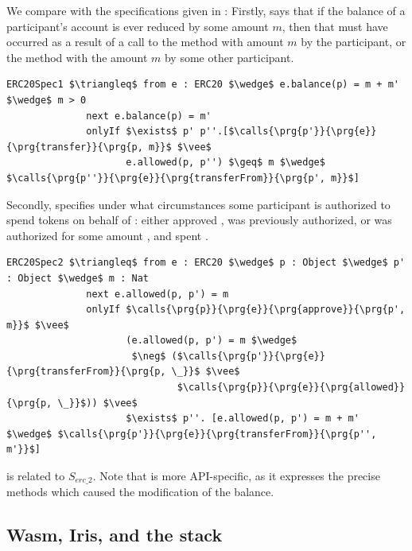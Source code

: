 \vspace{1cm}

We compare with the specifications given in \cite{OOPSLA22}:
 Firstly,  
says that if the balance of a participant's account is ever reduced by some amount $m$, then
that must have occurred as a result of a call to the  method with amount $m$ by the participant,
or the  method with the amount $m$ by some other participant.
\begin{lstlisting}[language = Chainmail, mathescape=true, frame=lines]
ERC20Spec1 $\triangleq$ from e : ERC20 $\wedge$ e.balance(p) = m + m' $\wedge$ m > 0
              next e.balance(p) = m'
              onlyIf $\exists$ p' p''.[$\calls{\prg{p'}}{\prg{e}}{\prg{transfer}}{\prg{p, m}}$ $\vee$ 
                     e.allowed(p, p'') $\geq$ m $\wedge$ $\calls{\prg{p''}}{\prg{e}}{\prg{transferFrom}}{\prg{p', m}}$]
\end{lstlisting}
Secondly,  specifies under what circumstances some participant  is authorized to 
spend  tokens on behalf of : either  approved ,  was previously authorized,
or  was authorized for some amount , and spent .
\begin{lstlisting}[language = Chainmail, mathescape=true, frame=lines]
ERC20Spec2 $\triangleq$ from e : ERC20 $\wedge$ p : Object $\wedge$ p' : Object $\wedge$ m : Nat
              next e.allowed(p, p') = m
              onlyIf $\calls{\prg{p}}{\prg{e}}{\prg{approve}}{\prg{p', m}}$ $\vee$ 
                     (e.allowed(p, p') = m $\wedge$ 
                      $\neg$ ($\calls{\prg{p'}}{\prg{e}}{\prg{transferFrom}}{\prg{p, \_}}$ $\vee$ 
                              $\calls{\prg{p}}{\prg{e}}{\prg{allowed}}{\prg{p, \_}}$)) $\vee$
                     $\exists$ p''. [e.allowed(p, p') = m + m' $\wedge$ $\calls{\prg{p'}}{\prg{e}}{\prg{transferFrom}}{\prg{p'', m'}}$]
\end{lstlisting}

 is related to $S_{erc\_2}$. Note that  is more API-specific, as it expresses the precise methods which caused the modification of the balance.

\subsection{Wasm, Iris, and the stack}

